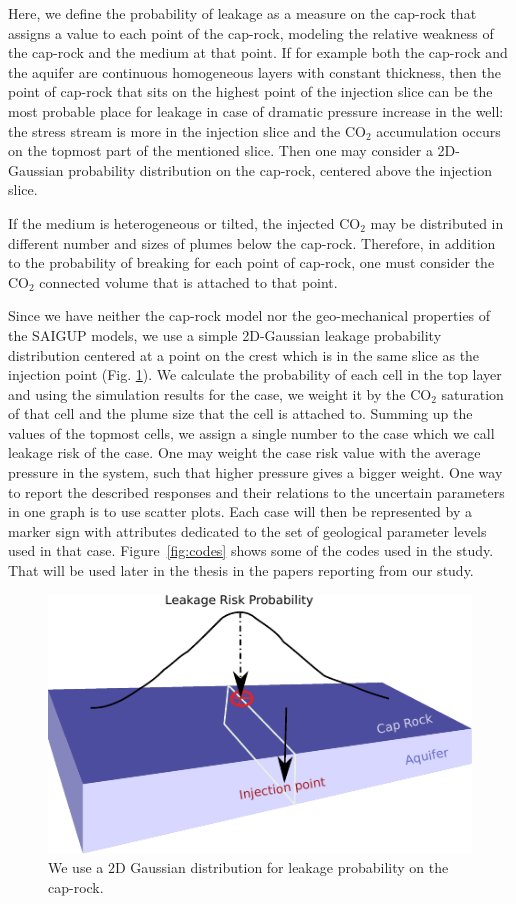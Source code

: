 Here, we define the probability of leakage as a measure on the cap-rock that
assigns a value to each point of the cap-rock, modeling the relative weakness of
the cap-rock and the medium at that point. If for example both the cap-rock and
the aquifer are continuous homogeneous layers with constant thickness, then the
point of cap-rock that sits on the highest point of the injection slice can be
the most probable place for leakage in case of dramatic pressure increase in the
well: the stress stream is more in the injection slice and the CO$_2$
accumulation occurs on the topmost part of the mentioned slice. Then one may
consider a 2D-Gaussian probability distribution on the cap-rock, centered above
the injection slice.

If the medium is heterogeneous or tilted, the injected CO$_2$ may be distributed
in different number and sizes of plumes below the cap-rock. Therefore, in
addition to the probability of breaking for each point of cap-rock, one must
consider the CO$_2$ connected volume that is attached to that point. 

Since we have neither the cap-rock model nor the geo-mechanical properties of
the SAIGUP models, we use a simple 2D-Gaussian leakage probability distribution
centered at a point on the crest which is in the same slice as the injection
point (Fig. \ref{fig:SLR}). We calculate the probability of each cell in the top
layer and using the simulation results for the case, we weight it by the CO$_2$
saturation of that cell and the plume size that the cell is attached to.
Summing up the values of the topmost cells, we assign a single number to the
case which we call leakage risk of the case. One may weight the case risk value
with the average pressure in the system, such that higher pressure gives a
bigger weight.
\vskip 0.5cm
One way to report the described responses and their relations to the uncertain
parameters in one graph is to use scatter plots. Each case will then be
represented by a marker sign with attributes dedicated to the set of geological
parameter levels used in that case. Figure~\ref{fig:codes} shows some of the
codes used in the study. That will be used later in the thesis in the papers
reporting from our study.


\begin{figure}
  \centering
  \includegraphics[width=0.65 \linewidth]{./figurer/LR_2} 
  \caption{We use a $2\mbox{D}$ Gaussian distribution for leakage probability
on the cap-rock.}
  \label{fig:SLR}
%
\end{figure}


